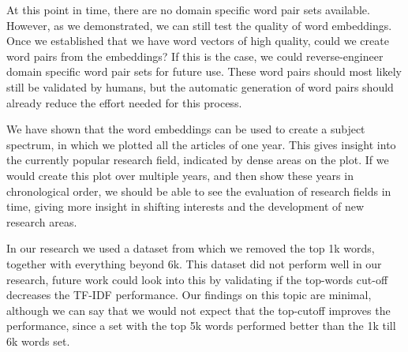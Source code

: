 \documentclass[../../Thesis.tex]{subfiles}
\begin{document}
At this point in time, there are no domain specific word pair sets available. However, as we demonstrated, we can still test the quality of word embeddings. Once we established that we have word vectors of high quality, could we create word pairs from the embeddings? If this is the case, we could reverse-engineer domain specific word pair sets for future use. These word pairs should most likely still be validated by humans, but the automatic generation of word pairs should already reduce the effort needed for this process.

We have shown that the word embeddings can be used to create a subject spectrum, in which we plotted all the articles of one year. This gives insight into the currently popular research field, indicated by dense areas on the plot. If we would create this plot over multiple years, and then show these years in chronological order, we should be able to see the evaluation of research fields in time, giving more insight in shifting interests and the development of new research areas.

In our research we used a dataset from which we removed the top 1k words, together with everything beyond 6k. This dataset did not perform well in our research, future work could look into this by validating if the top-words cut-off decreases the TF-IDF performance. Our findings on this topic are minimal, although we can say that we would not expect that the top-cutoff improves the performance, since a set with the top 5k words performed better than the 1k till 6k words set.
\end{document}
